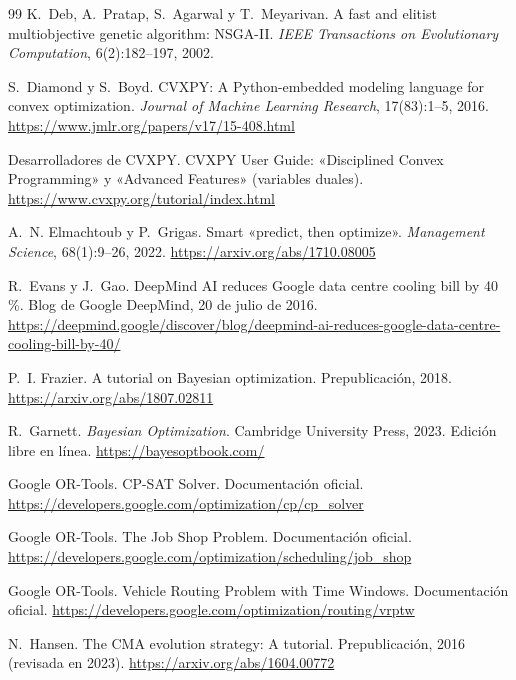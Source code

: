 \begin{thebibliography}{99}
K.~Deb, A.~Pratap, S.~Agarwal y T.~Meyarivan.
\newblock A fast and elitist multiobjective genetic algorithm: NSGA-II.
\newblock \emph{IEEE Transactions on Evolutionary Computation}, 6(2):182--197, 2002.

S.~Diamond y S.~Boyd.
\newblock CVXPY: A Python-embedded modeling language for convex optimization.
\newblock \emph{Journal of Machine Learning Research}, 17(83):1--5, 2016.
\newblock \url{https://www.jmlr.org/papers/v17/15-408.html}

Desarrolladores de CVXPY.
\newblock CVXPY User Guide: «Disciplined Convex Programming» y «Advanced Features» (variables duales).
\newblock \url{https://www.cvxpy.org/tutorial/index.html}

A.~N. Elmachtoub y P.~Grigas.
\newblock Smart «predict, then optimize».
\newblock \emph{Management Science}, 68(1):9--26, 2022.
\newblock \url{https://arxiv.org/abs/1710.08005}

R.~Evans y J.~Gao.
\newblock DeepMind AI reduces Google data centre cooling bill by 40\,\%.
\newblock Blog de Google DeepMind, 20 de julio de 2016.
\newblock \url{https://deepmind.google/discover/blog/deepmind-ai-reduces-google-data-centre-cooling-bill-by-40/}

P.~I. Frazier.
\newblock A tutorial on Bayesian optimization.
\newblock Prepublicación, 2018.
\newblock \url{https://arxiv.org/abs/1807.02811}

R.~Garnett.
\newblock \emph{Bayesian Optimization}.
\newblock Cambridge University Press, 2023. Edición libre en línea.
\newblock \url{https://bayesoptbook.com/}

Google OR-Tools.
\newblock CP-SAT Solver.
\newblock Documentación oficial.
\newblock \url{https://developers.google.com/optimization/cp/cp_solver}

Google OR-Tools.
\newblock The Job Shop Problem.
\newblock Documentación oficial.
\newblock \url{https://developers.google.com/optimization/scheduling/job_shop}

Google OR-Tools.
\newblock Vehicle Routing Problem with Time Windows.
\newblock Documentación oficial.
\newblock \url{https://developers.google.com/optimization/routing/vrptw}

N.~Hansen.
\newblock The CMA evolution strategy: A tutorial.
\newblock Prepublicación, 2016 (revisada en 2023).
\newblock \url{https://arxiv.org/abs/1604.00772}


\end{thebibliography}
